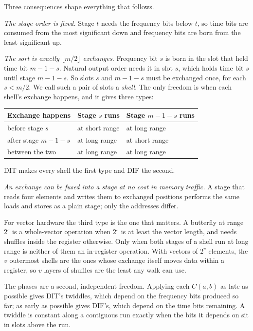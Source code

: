 \documentclass[conference]{IEEEtran}
\begin{document}
Three consequences shape everything that follows.

\emph{The stage order is fixed.}
Stage $t$ needs the frequency bits below $t$, so time bits are consumed from the most significant down and frequency bits are born from the least significant up.

\emph{The sort is exactly $\lfloor m/2\rfloor$ exchanges.}
Frequency bit $s$ is born in the slot that held time bit $m{-}1{-}s$.
Natural output order needs it in slot $s$, which holds time bit $s$ until stage $m{-}1{-}s$.
So slots $s$ and $m{-}1{-}s$ must be exchanged once, for each $s<m/2$.
We call such a pair of slots a \emph{shell}.
The only freedom is when each shell's exchange happens, and it gives three types:
\begin{center}
\begin{tabular}{@{}lll@{}}
\toprule
Exchange happens & Stage $s$ runs & Stage $m{-}1{-}s$ runs\\
\midrule
before stage $s$ & at short range & at long range\\
after stage $m{-}1{-}s$ & at long range & at short range\\
between the two & at long range & at long range\\
\bottomrule
\end{tabular}
\end{center}
DIT makes every shell the first type and DIF the second.

\emph{An exchange can be fused into a stage at no cost in memory traffic.}
A stage that reads four elements and writes them to exchanged positions performs the same loads and stores as a plain stage; only the addresses differ.

For vector hardware the third type is the one that matters.
A butterfly at range $2^s$ is a whole-vector operation when $2^s$ is at least the vector length, and needs shuffles inside the register otherwise.
Only when both stages of a shell run at long range is neither of them an in-register operation.
With vectors of $2^v$ elements, the $v$ outermost shells are the ones whose exchange itself moves data within a register, so $v$ layers of shuffles are the least any walk can use.

The phases are a second, independent freedom.
Applying each $C(a,b)$ as late as possible gives DIT's twiddles, which depend on the frequency bits produced so far; as early as possible gives DIF's, which depend on the time bits remaining.
A twiddle is constant along a contiguous run exactly when the bits it depends on sit in slots above the run.
\end{document}
